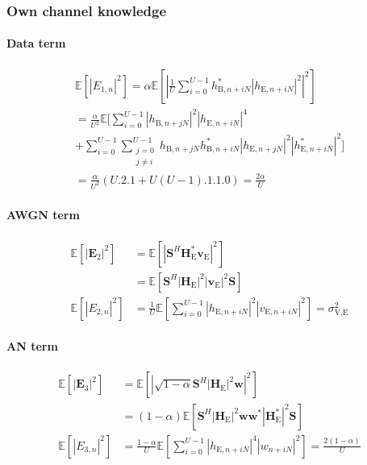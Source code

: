 \documentclass[journal,comsoc]{IEEEtran}
\newcommand{\module}[1]{\left|#1\right|}
\newcommand{\EX}[1]{\mathbb{E} \left[#1\right]}%
\newcommand{\HE}{\textbf{H}_{\text{E}}}
\newcommand{\ve}{\textbf{v}_{\text{E}}}
\newcommand{\spread}{\textbf{S}}
\newcommand{\w}{\textbf{w}}
\begin{document}
\subsubsection{Own channel knowledge}\label{sec:own-channel-knowledge-app}
\paragraph{Data term}\label{sec:data-term-app-3}
\begin{multline}
	\EX{|E_{1,n}|^2} = \alpha \EX{\left|\frac{1}{U}\sum_{i=0}^{U-1} h_{\text{B}, n + iN}^* \left| h_{\text{E}, n + iN}\right|^2\right|^2} \\
	=\frac{\alpha}{U^2} \mathbb{E}\Bigg[ \sum_{i=0}^{U-1} \left| h_{\text{B}, n + jN}\right|^2 \left| h_{\text{E}, n + iN}\right|^4 \\
	+ \sum_{i=0}^{U-1}\sum_{\substack{j=0 \\ j\neq i}}^{U-1}  h_{\text{B}, n + jN} h^*_{\text{B}, n + iN} \left| h_{\text{E}, n + jN}\right|^2 \left| h^*_{\text{E}, n + iN}\right|^2 \Bigg] \\
	= \frac{\alpha}{U^2} \left(U.2.1 + U(U-1).1.1.0\right) = \frac{2\alpha}{U}
	\label{eq:data_eve_filt5-app}
\end{multline}


\paragraph{AWGN term}\label{sec:awgn-term-app-3}
\begin{equation}
	\begin{split}
		\EX{|\textbf{E}_{2}|^2} &=  \EX{\module{\spread^H \HE^* \ve}^2} \\
		&=\EX{\spread^H   \left|\HE\right|^2  \left|\ve\right|^2 \spread } \\
		\EX{|E_{2,n}|^2} &= \frac{1}{U} \EX{\sum_{i=0}^{U-1} |h_{\text{E}, n + iN}|^2 |v_{\text{E}, n + iN}|^2} = \sigma^2_{\text{V,E}}
	\end{split}
	\label{eq:noise_eve_filt5-app}
\end{equation}

\paragraph{AN term}\label{sec:an-term-app-3}
\begin{equation}
	\begin{split}
		\EX{|\textbf{E}_{3}|^2} &=  \EX{\module{\sqrt{1-\alpha}\spread^H \left|\HE\right|^2 \w}^2} \\
		&=(1-\alpha)\EX{\spread^H \left|\HE\right|^2 \w\w^* \left|\HE^*\right|^2\spread } \\
		\EX{|E_{3,n}|^2}  &= \frac{1-\alpha}{U} \EX{\sum_{i=0}^{U-1} |h_{\text{E}, n + iN}|^4 |w_{n + iN}|^2} = \frac{2(1-\alpha)}{U}
	\end{split}
	\label{eq:an_eve_filt5-app}
\end{equation}
\end{document}
